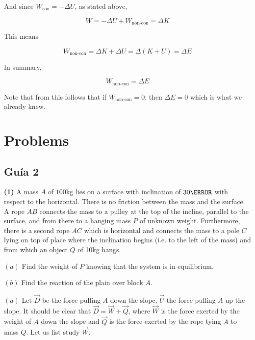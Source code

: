 \documentclass[12pt]{article}
\theoremstyle{definition}
\begin{document}
And since $W_{\text{con}} = -\Delta U$, as stated above, 

\begin{equation*}
    W = -\Delta U + W_{\text{non-con}} = \Delta K
\end{equation*}

This means 

\begin{equation*}
    W_{\text{non-con}} = \Delta K + \Delta U = \Delta(K + U) = \Delta E
\end{equation*}

In summary, 

\begin{equation}
    W_{\text{non-con}} = \Delta E
\end{equation}

Note that from this follows that if $W_{\text{non-con}} = 0$, then $\Delta E =
0$ which is what we already knew.





\pagebreak 

\section{Problems}

\subsection{Guía 2}

\begin{shaded}
    \textbf{(1)} A mass $A$ of $100$kg lies on a surface with inclination of
    $30\degree$ with respect to the horizontal. There is no friction between the
    mass and the surface. A rope $AB$ connects the mass to a pulley at the top
    of the incline, parallel to the surface, and from there to a hanging mass
    $P$ of unknown weight. Furthermore, there is a second rope $AC$ which is 
    horizontal and connects the mass to a pole $C$ lying on top of place where
    the inclination begins (i.e. to the left of the mass) and from which an
    object $Q$ of 10kg hangs.  

    $(a)$ Find the weight of $P$ knowing that the system is in equilibrium.

    $(b)$ Find the reaction of the plain over block $A$.
\end{shaded}

$(a)$ Let $\vec{D}$ be the force pulling $A$ down the slope, $\vec{U}$ the force pulling $A$
up the slope. It should be clear that $\vec{D} = \vec{W} + \vec{Q}$, where
$\vec{W}$ is the force exerted by the weight of $A$ down the slope and $\vec{Q}$
is the force exerted by the rope tying $A$ to mass $Q$. Let us fist study
$\vec{W}$.
\end{document}
